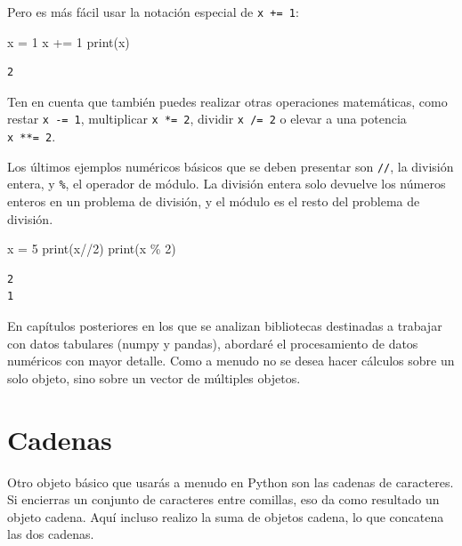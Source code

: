 \documentclass[
  letterpaper,
]{scrbook}
\newenvironment{Shaded}{\begin{snugshade}}{\end{snugshade}}
\newcommand{\BuiltInTok}[1]{\textcolor[rgb]{0.00,0.23,0.31}{#1}}
\newcommand{\DecValTok}[1]{\textcolor[rgb]{0.68,0.00,0.00}{#1}}
\newcommand{\NormalTok}[1]{\textcolor[rgb]{0.00,0.23,0.31}{#1}}
\newcommand{\OperatorTok}[1]{\textcolor[rgb]{0.37,0.37,0.37}{#1}}
\begin{document}
Pero es más fácil usar la notación especial de \texttt{x\ +=\ 1}:

\begin{Shaded}
\begin{Highlighting}[]
\NormalTok{x }\OperatorTok{=} \DecValTok{1}
\NormalTok{x }\OperatorTok{+=} \DecValTok{1}
\BuiltInTok{print}\NormalTok{(x)}
\end{Highlighting}
\end{Shaded}

\begin{verbatim}
2
\end{verbatim}

Ten en cuenta que también puedes realizar otras operaciones matemáticas,
como restar \texttt{x\ -=\ 1}, multiplicar \texttt{x\ *=\ 2}, dividir
\texttt{x\ /=\ 2} o elevar a una potencia \texttt{x\ **=\ 2}.

Los últimos ejemplos numéricos básicos que se deben presentar son
\texttt{//}, la división entera, y \texttt{\%}, el operador de módulo.
La división entera solo devuelve los números enteros en un problema de
división, y el módulo es el resto del problema de división.

\begin{Shaded}
\begin{Highlighting}[]
\NormalTok{x }\OperatorTok{=} \DecValTok{5}
\BuiltInTok{print}\NormalTok{(x}\OperatorTok{//}\DecValTok{2}\NormalTok{)}
\BuiltInTok{print}\NormalTok{(x }\OperatorTok{\%} \DecValTok{2}\NormalTok{)}
\end{Highlighting}
\end{Shaded}

\begin{verbatim}
2
1
\end{verbatim}

En capítulos posteriores en los que se analizan bibliotecas destinadas a
trabajar con datos tabulares (numpy y pandas), abordaré el procesamiento
de datos numéricos con mayor detalle. Como a menudo no se desea hacer
cálculos sobre un solo objeto, sino sobre un vector de múltiples
objetos.

\section{Cadenas}\label{subsec-strings}

Otro objeto básico que usarás a menudo en Python son las cadenas de
caracteres. Si encierras un conjunto de caracteres entre comillas, eso
da como resultado un objeto cadena. Aquí incluso realizo la suma de
objetos cadena, lo que concatena las dos cadenas.
\end{document}
